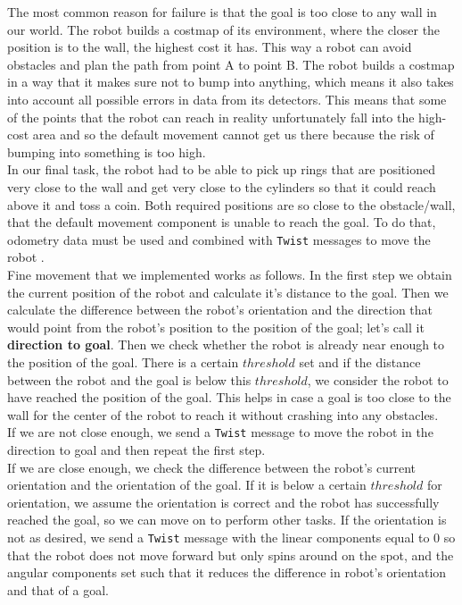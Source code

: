 \documentclass[12pt,a4paper]{article}
\begin{document}
	The most common reason for failure is that the goal is too close to any wall in our world. The robot builds a costmap of its environment, where the closer the position is to the wall, the highest cost it has. This way a robot can avoid obstacles and plan the path from point A to point B. The robot builds a costmap in a way that it makes sure not to bump into anything, which means it also takes into account all possible errors in data from its detectors. This means that some of the points that the robot can reach in reality unfortunately fall into the high-cost area and so the default movement cannot get us there because the risk of bumping into something is too high. \\

	In our final task, the robot had to be able to pick up rings that are positioned very close to the wall and get very close to the cylinders so that it could reach above it and toss a coin. Both required positions are so close to the obstacle/wall, that the default movement component is unable to reach the goal. To do that, odometry data must be used and combined with \texttt{Twist} messages to move the robot . \\

	Fine movement that we implemented works as follows. In the first step we obtain the current position of the robot and calculate it's distance to the goal. Then we calculate the difference between the robot's orientation and the direction that would point from the robot's position to the position of the goal; let's call it \textbf{direction to goal}. Then we check whether the robot is already near enough to the position of the goal. There is a certain $threshold$ set and if the distance between the robot and the goal is below this $threshold$, we consider the robot to have reached the position of the goal. This helps in case a goal is too close to the wall for the center of the robot to reach it without crashing into any obstacles. \\
	
	If we are not close enough, we send a \texttt{Twist} message to move the robot in the direction to goal and then repeat the first step. \\
	
	If we are close enough, we check the difference between the robot's current orientation and the orientation of the goal. If it is below a certain $threshold$ for orientation, we assume the orientation is correct and the robot has successfully reached the goal, so we can move on to perform other tasks. If the orientation is not as desired, we send a \texttt{Twist} message with the linear components equal to 0 so that the robot does not move forward but only spins around on the spot, and the angular components set such that it reduces the difference in robot's orientation and that of a goal. \\
\end{document}
